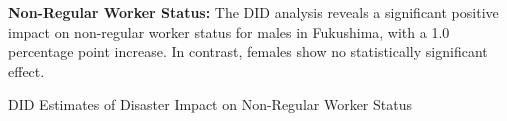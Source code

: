 \documentclass[serif, aspectratio=169]{beamer}
\begin{document}

\begin{frame}[label=nonregular_status]

\textbf{Non-Regular Worker Status:} The DID analysis reveals a significant positive impact on non-regular worker status for males in Fukushima, with a 1.0 percentage point increase. In contrast, females show no statistically significant effect.

\begin{table}[htbp]
\centering
\caption{DID Estimates of Disaster Impact on Non-Regular Worker Status}

\vspace{-0.2cm}



\end{table}
\end{frame}
\end{document}
